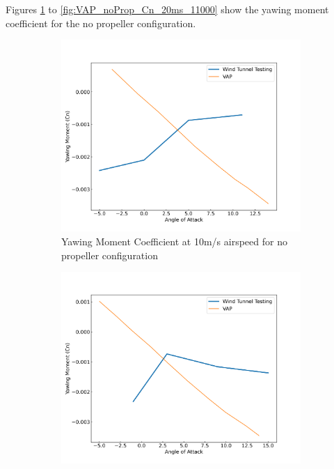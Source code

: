 Figures \ref{fig:VAP_noProp_Cn_10ms_6000} to \ref{fig:VAP_noProp_Cn_20ms_11000} show the yawing moment coefficient for the no propeller configuration.


\begin{figure}[H]
    \centering
    \begin{subfigure}[b]{0.467\textwidth}
        \centering
        \includegraphics[width=\textwidth]{05_Results/VAP/noProp/Cn/10ms_6000RPM_Cn.png}
        \caption{Yawing Moment Coefficient at 10m/s airspeed for no propeller configuration}
        \label{fig:VAP_noProp_Cn_10ms_6000}
    \end{subfigure}
    \begin{subfigure}[b]{0.467\textwidth}
        \centering
        \includegraphics[width=\textwidth]{05_Results/VAP/noProp/Cn/10ms_11000RPM_Cn.png}

\end{subfigure}
\end{figure}
